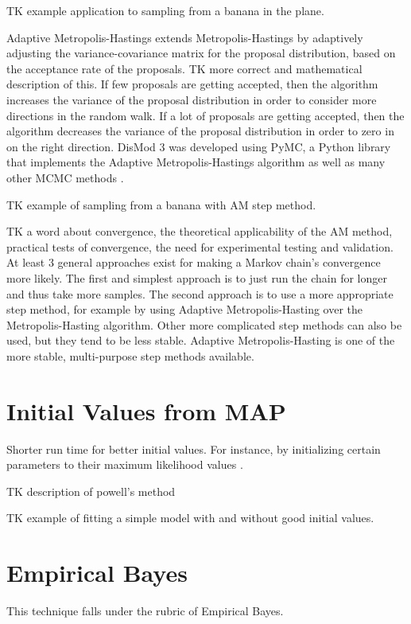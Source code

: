 TK example application to sampling from a banana in the plane.

Adaptive Metropolis-Hastings extends Metropolis-Hastings by adaptively
adjusting the variance-covariance matrix for the proposal
distribution, based on the acceptance rate of the proposals.  TK more
correct and mathematical description of this. If few proposals are
getting accepted, then the algorithm increases the variance of the
proposal distribution in order to consider more directions in the
random walk. If a lot of proposals are getting accepted, then the
algorithm decreases the variance of the proposal distribution in order
to zero in on the right direction. DisMod 3 was developed using PyMC,
a Python library that implements the Adaptive Metropolis-Hastings
algorithm as well as many other MCMC methods \cite{Patil_PyMC_2010}.

TK example of sampling from a banana with AM step method.

TK a word about convergence, the theoretical applicability of the AM
method, practical tests of convergence, the need for experimental
testing and validation.  At least 3 general approaches exist for
making a Markov chain's convergence more likely. The first and
simplest approach is to just run the chain for longer and thus take
more samples. The second approach is to use a more appropriate step
method, for example by using Adaptive Metropolis-Hasting over the
Metropolis-Hasting algorithm. Other more complicated step methods can
also be used, but they tend to be less stable. Adaptive
Metropolis-Hasting is one of the more stable, multi-purpose step
methods available.

\section{Initial Values from MAP}
Shorter run time for better initial values. For instance, by
initializing certain parameters to their maximum likelihood values
\cite{Bishop_Neural_1995}.

TK description of powell's method

TK example of fitting a simple model with and without good initial
values.

\section{Empirical Bayes}

This technique falls under the rubric of Empirical Bayes.

